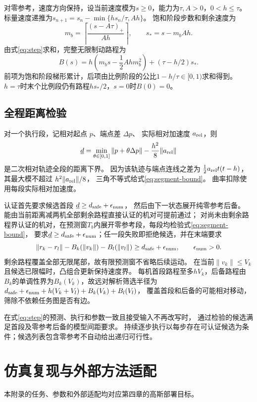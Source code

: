 \documentclass[UTF8,a4paper,11pt,fontset=none]{ctexart}
\begin{document}
对零参考，速度方向保持，设当前速度模为$s\ge0$，能力为$\tau,A>0$，$0<h\le\tau$。
标量速度递推为$s_{n+1}=s_n-\min\{hs_n/\tau,Ah\}$。
饱和阶段步数和剩余速度为
\[
m_b=\left\lceil\frac{(s-A\tau)_+}{Ah}\right\rceil,\qquad s_*=s-m_bAh .
\]
由式\eqref{eq:step}求和，完整无限制动路程为
\begin{equation}
B(s)=h\left(m_bs-\frac12Ahm_b^2\right)+(\tau-h/2)s_* .
\label{eq:braking-path}
\end{equation}
前项为饱和阶段梯形累计，后项由比例阶段的公比$1-h/\tau\in[0,1)$求和得到。
$h=\tau$时末个比例段仍有路程$hs_*/2$，$s=0$时$B(0)=0$。

\subsection{全程距离检验}
对一个执行段，记相对起点 $p$、端点差 $\Delta p$、
实际相对加速度 $a_{\rm rel}$，则
\begin{equation}
\underline d=\min_{\theta\in[0,1]}\|p+\theta\Delta p\|
-\frac{h^2}{8}\|a_{\rm rel}\|
\label{eq:segment-bound}
\end{equation}
是二次相对轨迹全段的距离下界。
因为该轨迹与端点连线之差为
$\frac12a_{\rm rel}t(t-h)$，其最大模不超过 $h^2\|a_{\rm rel}\|/8$，
三角不等式给式\eqref{eq:segment-bound}。
曲率扣除使用每段实际相对加速度。

认证首先要求候选首段 $\underline d\ge d_{\rm safe}+\epsilon_{\rm num}$，
然后由下一状态展开纯零参考后备。
能由当前距离减两机全部剩余路程直接认证的机对可提前通过；
对尚未由剩余路程界认证的机对，在预测窗$T_b$内展开零参考段，每段均检验式\eqref{eq:segment-bound}，
要求$\underline d\ge d_{\rm safe}+\epsilon_{\rm num}$；任一段失败即拒绝候选，并在末端要求
\[
\|r_k-r_l\|-B_k(\|v_k\|)-B_l(\|v_l\|)
\ge d_{\rm safe}+\epsilon_{\rm num},\qquad\epsilon_{\rm num}>0.
\]
剩余路程覆盖全部无限尾部，故有限预测窗不省略后续运动。
在当前$\|v_k\|\le V_k$且候选已限幅时，凸组合更新保持速度界。
每机首段路程至多$hV_k$，后备路程由$B_k$的单调性界为$B_k(V_k)$，故远对解析筛选半径为
$d_{\rm safe}+\epsilon_{\rm num}+h(V_k+V_l)+B_k(V_k)+B_l(V_l)$，
覆盖首段和后备的可能相对移动，筛除不依赖任务图是否有边。

在式\eqref{eq:step}的预测、执行和参数一致且接受输入不再改写时，
通过检验的候选满足首段及零参考后备的模型间距要求。
持续逐步执行以每步存在可认证候选为条件；候选列表包含零参考不自动给出递归可行性。

\section{仿真复现与外部方法适配}\label{app:external}
本附录的任务、参数和外部适配均对应第四章的高斯部署目标。
\end{document}
